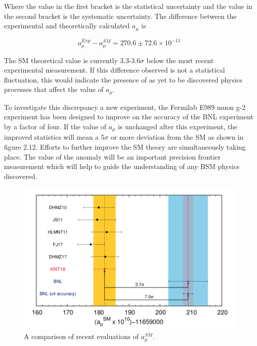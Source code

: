 Where the value in the first bracket is the statistical uncertainty and the value in the second bracket is the systematic uncertainty. The difference between the experimental and theoretically calculated $a_{\mu}$ is

\begin{equation}
a_{\mu}^{Exp} - a_{\mu}^{SM} = 270.6{\pm}72.6{\times}10^{-11}
\end{equation}

The SM theoretical value is currently 3.3-3.6$\sigma$ \cite{Reference29} below the most recent experimental measurement. If this difference observed is not a statistical fluctuation, this would indicate the presence of as yet to be discovered physics processes that affect the value of $a_{\mu}$.

To investigate this discrepancy a new experiment, the Fermilab E989 muon g-2 experiment has been designed to improve on the accuracy of the BNL experiment by a factor of four. If the value of $a_{\mu}$ is unchanged after this experiment, the improved statistics will mean a 5$\sigma$ or more deviation from the SM as shown in figure 2.12. Efforts to further improve the SM theory are simultaneously taking place. 
The value of the anomaly will be an important precision frontier measurement which will help to guide the understanding of any BSM physics discovered.

\begin{figure}[th]
\centering
\includegraphics[scale=0.7]{Figures/SManomalousMagMom}
\decoRule
\caption{A comparison of recent evaluations of $a_{\mu}^{SM}$.}
\label{fig:SManomalousMagMom}
\end{figure}


